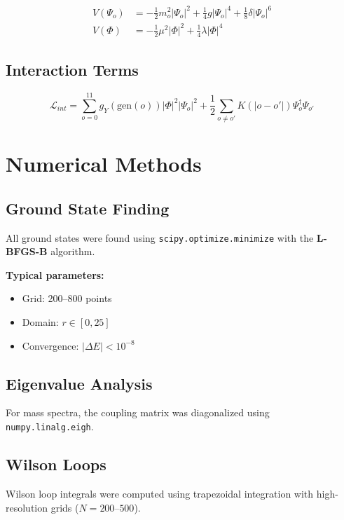 \documentclass[11pt, a4paper]{article}
\theoremstyle{remark}
\begin{document}
\begin{align}
V(\Psi_o) &= -\frac{1}{2} m_o^2 |\Psi_o|^2 + \frac{1}{4} g |\Psi_o|^4 + \frac{1}{8} \delta |\Psi_o|^6 \\
V(\Phi) &= -\frac{1}{2} \mu^2 |\Phi|^2 + \frac{1}{4} \lambda |\Phi|^4
\end{align}

\subsection{Interaction Terms}

\begin{equation}
\mathcal{L}_{int} = \sum_{o=0}^{11} g_Y(\text{gen}(o)) |\Phi|^2 |\Psi_o|^2 + \frac{1}{2} \sum_{o \neq o'} K(|o-o'|) \Psi_o^\dagger \Psi_{o'}
\end{equation}

\section{Numerical Methods}

\subsection{Ground State Finding}

All ground states were found using \texttt{scipy.optimize.minimize} with the \textbf{L-BFGS-B} algorithm.

\textbf{Typical parameters:}
\begin{itemize}
    \item Grid: 200--800 points
    \item Domain: $r \in [0, 25]$
    \item Convergence: $|\Delta E| < 10^{-8}$
\end{itemize}

\subsection{Eigenvalue Analysis}

For mass spectra, the coupling matrix was diagonalized using \texttt{numpy.linalg.eigh}.

\subsection{Wilson Loops}

Wilson loop integrals were computed using trapezoidal integration with high-resolution grids ($N = 200$--$500$).
\end{document}
